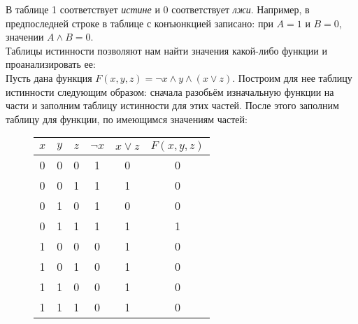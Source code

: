 \documentclass[12pt]{article}
\theoremstyle{problem_style}
\begin{document}
В таблице 1 соответствует \textit{истине} и 0 соответствует \textit{лжи}. Например, в предпоследней строке в таблице с конъюнкцией записано: при \(A = 1\) и \(B = 0\), значении \(A \land B = 0\).\\
Таблицы истинности позволяют нам найти значения какой-либо функции и проанализировать ее:\\
Пусть дана функция \(F(x, y, z) = \lnot x \land y \land (x \lor z)\).
Построим для нее таблицу истинности следующим образом: сначала разобьём изначальную функции на части и заполним таблицу истинности для этих частей. После этого заполним таблицу для функции, по имеющимся значениям частей:
\begin{figure}[h!]
    \centering
        \begin{tabular}{|c|c|c|c|c|c|}
        \hline
        $x$ & $y$ & $z$ & \(\lnot x\) & \(x \lor z\) & \(F(x, y, z)\) \\
        \hline
        0 & 0 & 0 & 1 & 0 & 0\\
        0 & 0 & 1 & 1 & 1 & 0\\
        0 & 1 & 0 & 1 & 0 & 0\\
        0 & 1 & 1 & 1 & 1 & 1\\
        1 & 0 & 0 & 0 & 1 & 0\\
        1 & 0 & 1 & 0 & 1 & 0\\
        1 & 1 & 0 & 0 & 1 & 0\\
        1 & 1 & 1 & 0 & 1 & 0\\
        \hline
        \end{tabular}
\end{figure}
\end{document}
